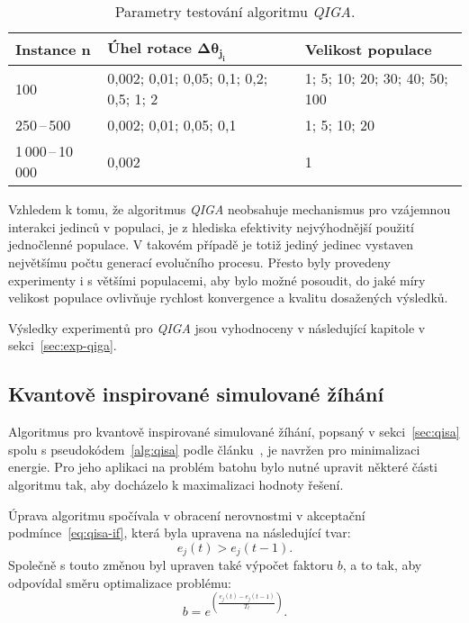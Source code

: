 \begin{table}[ht]
  \centering
  \begin{tabularx}{\linewidth}{l X X }
    \toprule
    \textbf{Instance $\boldsymbol{n}$} & \textbf{Úhel rotace $\boldsymbol{\Delta\theta_{j_i}}$} & \textbf{Velikost populace} \\
    \midrule
    100
      & 0,002; 0,01; 0,05; 0,1; 0,2; 0,5; 1; 2
      & 1; 5; 10; 20; 30; 40; 50; 100 \\[1ex]
    250\,--\,500
      & 0,002; 0,01; 0,05; 0,1
      & 1; 5; 10; 20 \\[1ex]
    1\,000\,--\,10\,000
      & 0,002
      & 1 \\
    \bottomrule
  \end{tabularx}
  \caption{Parametry testování algoritmu \emph{QIGA}.}
  \label{tab:qiga-all-instance}
\end{table}


Vzhledem k tomu, že algoritmus \emph{QIGA} neobsahuje mechanismus pro vzájemnou interakci jedinců v populaci, je z hlediska efektivity nejvýhodnější použití jednočlenné populace.
V takovém případě je totiž jediný jedinec vystaven největšímu počtu generací evolučního procesu. 
Přesto byly provedeny experimenty i s většími populacemi, aby bylo možné posoudit, do jaké míry velikost populace ovlivňuje rychlost konvergence a kvalitu dosažených výsledků. 

Výsledky experimentů pro \emph{QIGA} jsou vyhodnoceny v následující kapitole v sekci~\ref{sec:exp-qiga}.

\subsection*{Kvantově inspirované simulované žíhání}
Algoritmus pro kvantově inspirované simulované žíhání, popsaný v sekci~\ref{sec:qisa} spolu s pseudokódem~\ref{alg:qisa} podle článku~\cite{qisa}, je navržen pro minimalizaci energie. 
Pro jeho aplikaci na problém batohu bylo nutné upravit některé části algoritmu tak, aby docházelo k maximalizaci hodnoty řešení.

Úprava algoritmu spočívala v obracení nerovnostmi v akceptační podmínce~\ref{eq:qisa-if}, která byla upravena na následující tvar:
\begin{equation*}
    e_j\left(t\right) > e_j\left(t-1\right).
\end{equation*}
Společně s touto změnou byl upraven také výpočet faktoru $b$, a to tak, aby odpovídal směru optimalizace problému:
\begin{equation*}
    b = e^{\left(\frac{e_j\left(t\right) - e_j\left(t-1\right)}{T_t}\right)}.
\end{equation*}

